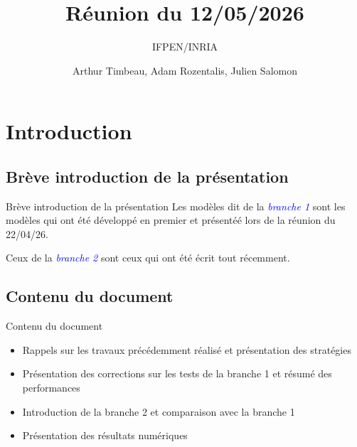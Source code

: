 \documentclass[
11pt,notheorems,hyperref={pdfauthor=whatever}
]{beamer}
\title[
]{Réunion du 12/05/2026}
\subtitle{IFPEN/INRIA}
\author[
]{
    Arthur Timbeau, 
    Adam Rozentalis,
    Julien Salomon
}
\begin{document}

\begin{frame}
  \titlepage
\end{frame}


\begin{frame}
    \tableofcontents
\end{frame}

\section{Introduction}

\subsection{Brève introduction de la présentation}
\begin{frame}{Brève introduction de la présentation}
    Les modèles dit de la \textcolor{blue}{\textit{branche 1}} sont les modèles qui ont 
    été développé en premier et présentéé lors de la réunion du 22/04/26.
    
    \vspace{0.3cm}

    Ceux de la \textcolor{blue}{\textit{branche 2}} sont ceux qui ont été écrit tout récemment. 
\end{frame}

\subsection{Contenu du document}
\begin{frame}{Contenu du document}
    \begin{itemize}
        \item Rappels sur les travaux précédemment réalisé et présentation des stratégies 
        \item Présentation des corrections sur les tests de la branche 1 et résumé des performances
        \item Introduction de la branche 2 et comparaison avec la branche 1
        \item Présentation des résultats numériques
    \end{itemize}    
\end{frame}
\end{document}
